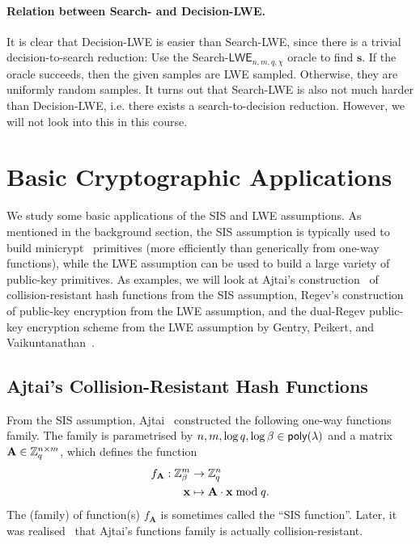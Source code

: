 \documentclass[10pt,twoside]{article}
\renewcommand{\vec}[1]{\mathbf{#1}}
\newcommand{\mat}[1]{\mathbf{#1}}
\newcommand{\LWE}{\mathsf{LWE}}
\begin{document}
\paragraph{Relation between Search- and Decision-LWE.}
It is clear that Decision-LWE is easier than Search-LWE, since there is a trivial decision-to-search reduction: Use the Search-$\LWE_{n,m,q,\chi}$ oracle to find $\vec{s}$. If the oracle succeeds, then the given samples are LWE sampled. Otherwise, they are uniformly random samples. It turns out that Search-LWE is also not much harder than Decision-LWE, i.e. there exists a search-to-decision reduction. However, we will not look into this in this course.

\section{Basic Cryptographic Applications}

We study some basic applications of the SIS and LWE assumptions.
As mentioned in the background section, the SIS assumption is typically used to build minicrypt~\cite{Imp95} primitives (more efficiently than generically from one-way functions), while the LWE assumption can be used to build a large variety of public-key primitives.
As examples, we will look at Ajtai's construction~\cite{STOC:Ajtai96,EPRINT:GolGolHal96a} of collision-resistant hash functions from the SIS assumption, Regev's construction~\cite{STOC:Regev05} of public-key encryption from the LWE assumption, and the dual-Regev public-key encryption scheme from the LWE assumption by Gentry, Peikert, and Vaikuntanathan~\cite{STOC:GenPeiVai08}.


\subsection{Ajtai's Collision-Resistant Hash Functions}

From the SIS assumption, Ajtai~\cite{STOC:Ajtai96} constructed the following one-way functions family.
The family is parametrised by $n,m, \log q,\log \beta \in \poly$ and a matrix $\mat{A} \in \ZZ_q^{n \times m}$, which defines the function
\begin{align*}
    f_{\mat{A}}: \ZZ_\beta^m &\to \ZZ_q^n \\
    \vec{x} &\mapsto \mat{A} \cdot \vec{x} \bmod q.
\end{align*}
The (family) of function(s) $f_{\mat{A}}$ is sometimes called the ``SIS function''.
Later, it was realised~\cite{EPRINT:GolGolHal96a} that Ajtai's functions family is actually collision-resistant.
\end{document}
